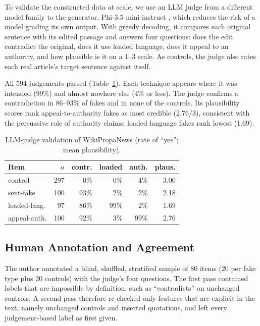 \documentclass[11pt]{article}
\begin{document}
To validate the constructed data at scale, we use an LLM judge from a different model family to the generator, Phi-3.5-mini-instruct \citep{abdin2024phi3}, which reduces the risk of a model grading its own output. With greedy decoding, it compares each original sentence with its edited passage and answers four questions: does the edit contradict the original, does it use loaded language, does it appeal to an authority, and how plausible is it on a 1--3 scale. As controls, the judge also rates each real article's target sentence against itself.

All 594 judgements parsed (Table~\ref{tab:judge}). Each technique appears where it was intended (99\%) and almost nowhere else (4\% or less). The judge confirms a contradiction in 86--93\% of fakes and in none of the controls. Its plausibility scores rank appeal-to-authority fakes as most credible (2.76/3), consistent with the persuasive role of authority claims; loaded-language fakes rank lowest (1.69).

\begin{table}[t]
\centering\small
\setlength{\tabcolsep}{3.5pt}
\begin{tabular}{lrrrrr}
\toprule
Item & $n$ & contr. & loaded & auth. & plaus. \\
\midrule
control & 297 & 0\% & 0\% & 4\% & 3.00 \\
sent-fake & 100 & 93\% & 2\% & 2\% & 2.18 \\
loaded-lang. & 97 & 86\% & 99\% & 2\% & 1.69 \\
appeal-auth. & 100 & 92\% & 3\% & 99\% & 2.76 \\
\bottomrule
\end{tabular}
\caption{LLM-judge validation of WikiPropaNews (rate of ``yes''; mean plausibility).}
\label{tab:judge}
\end{table}

\subsection{Human Annotation and Agreement}
\label{sec:human}

The author annotated a blind, shuffled, stratified sample of 80 items (20 per fake type plus 20 controls) with the judge's four questions. The first pass contained labels that are impossible by definition, such as ``contradicts'' on unchanged controls. A second pass therefore re-checked only features that are explicit in the text, namely unchanged controls and inserted quotations, and left every judgement-based label as first given.
\end{document}
